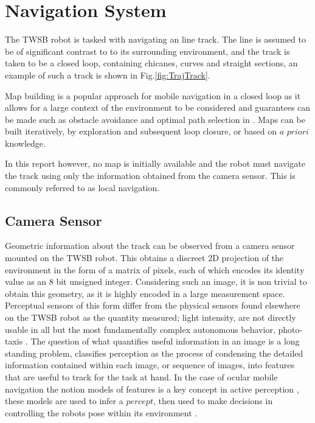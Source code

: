         \section{Navigation System}
        The TWSB robot is tasked with navigating an line track.
        The line is assumed to be of significant contrast to to its surrounding environment,
        and the track is taken to be a closed loop, containing chicanes, curves and straight sections, 
        an example of such a track is shown in Fig.\ref{fig:TrajTrack}.

        Map building is a popular approach for mobile navigation in a closed loop as it allows for a large 
        context of the environment to be considered and guarantees can be made such as obstacle avoidance 
        and optimal path selection in \cite{Macenski_2020}. Maps can be built iteratively, by exploration 
        and subsequent loop closure, or based on $\textit{a priori}$ knowledge.

        In this report however, no map is initially available and the robot must navigate the track using only
        the information obtained from the camera sensor. This is commonly referred to as local navigation. 
    
        \subsection{Camera Sensor}
        Geometric information about the track can be observed from a camera sensor mounted on the TWSB robot.
        This obtains a discreet 2D projection of the environment in the form of a matrix of pixels, each of which encodes 
        its identity value as an 8 bit unsigned integer. Considering such an image, it is non trivial to
        obtain this geometry, as it is highly encoded in a large measurement space. Perceptual sensors of this form differ from 
        the physical sensors found elsewhere on the TWSB robot as the quantity measured; light intensity, are not directly 
        usable in all but the most fundamentally complex autonomous behavior, photo-taxis \cite{hasslacher1995living}. 
        The question of what quantifies useful information in an image is a long standing problem,  \cite{siegwart2011introduction} classifies 
        perception as the process of condensing the detailed information contained within each image, or sequence of images, 
        into features that are useful to track for the task at hand.
        In the case of ocular mobile navigation the notion models of features is a key concept in active perception \cite{Activeperception},
        these models are used to infer a $\textit{percept}$, then used to make decisions in controlling the robots pose within its environment 
        \cite{hutchinson1996tutorial}. 

